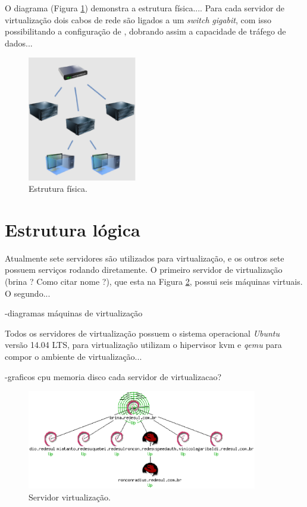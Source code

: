 O diagrama (Figura \ref{fig:servfisicos}) demonstra a estrutura física....
Para cada servidor de virtualização dois cabos de rede são ligados a um \textit{switch} \textit{gigabit}, com isso possibilitando a configuração 
de , dobrando assim a capacidade de tráfego de dados...

\begin{figure}[servfisicos]
 \centering
 \includegraphics[width=180px]{img/servfisicos.eps}
 \caption{Estrutura física.}
 \label{fig:servfisicos}
\end{figure}

\section{Estrutura lógica}
\label{section:estlog}

Atualmente sete servidores são utilizados para virtualização, e os outros sete possuem serviços rodando diretamente. O primeiro servidor 
de virtualização (brina ? Como citar nome ?), que esta na Figura \ref{fig:servlog_1}, possui seis máquinas virtuais.
O segundo...

-diagramas máquinas de virtualização

Todos os servidores de virtualização possuem o sistema operacional \textit{Ubuntu} versão 14.04 LTS, para virtualização utilizam o hipervisor 
\ac{kvm} e \textit{qemu} para compor o ambiente de virtualização...

-graficos cpu memoria disco cada servidor de virtualizacao?

\begin{figure}[servlog_1]
 \centering
 \includegraphics[width=380px]{img/servlog_1.eps}
 \caption{Servidor virtualização.}
 \label{fig:servlog_1}
\end{figure}

